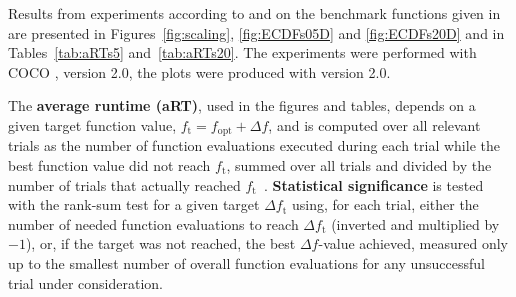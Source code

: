\documentclass[sigconf]{acmart}
\newcommand{\Df}{\ensuremath{\Delta f}}
\newcommand{\fopt}{\ensuremath{f_\mathrm{opt}}}
\newcommand{\ftarget}{\ensuremath{f_\mathrm{t}}}
\newcommand{\change}[1]{{\color{red} #1}}
\begin{document}
Results from experiments according to \cite{hansen2016exp} and \cite{hansen2016perfass} on the
benchmark functions given in \cite{wp200901_2010,hansen2010fun} are
presented in Figures~\ref{fig:scaling}, \ref{fig:ECDFs05D} and
\ref{fig:ECDFs20D} and in Tables~\ref{tab:aRTs5} and~\ref{tab:aRTs20}.
The experiments were performed with COCO \cite{hansen2016cocoplat}, version
\change{2.0}, the plots were produced with version \change{2.0}.

The \textbf{average runtime (aRT)}, used in the figures and tables,
depends on a given target function value, $\ftarget=\fopt+\Df$, and is
computed over all relevant trials as the number of function
evaluations executed during each trial while the best function value
did not reach \ftarget, summed over all trials and divided by the
number of trials that actually reached \ftarget\
\cite{hansen2012exp,price1997dev}.  \textbf{Statistical significance}
is tested with the rank-sum test for a given target $\Delta\ftarget$
using, for each trial,
either the number of needed function evaluations to reach
$\Delta\ftarget$ (inverted and multiplied by $-1$), or, if the target
was not reached, the best $\Df$-value achieved, measured only up to
the smallest number of overall function evaluations for any
unsuccessful trial under consideration.



\end{document}
